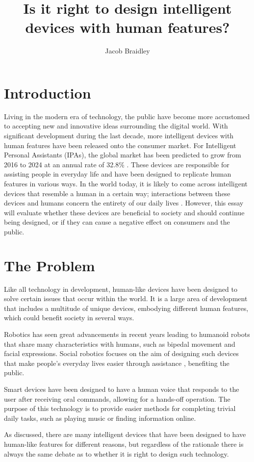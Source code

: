 \documentclass{article}
\title{Is it right to design intelligent devices with human features?}
\author{Jacob Braidley}
\date{}
\begin{document}
\maketitle

\vspace{0.5cm}

\section{Introduction}
Living in the modern era of technology, the public have become more accustomed to accepting new and innovative ideas surrounding the digital world. With significant development during the last decade, more intelligent devices with human features have been released onto the consumer market. For Intelligent Personal Assistants (IPAs), the global market has been predicted to grow from 2016 to 2024 at an annual rate of 32.8\% \cite{tmr2016market}. These devices are responsible for assisting people in everyday life and have been designed to replicate human features in various ways. In the world today, it is likely to come across intelligent devices that resemble a human in a certain way; interactions between these devices and humans concern the entirety of our daily lives \cite{securityTech2022interactions}. However, this essay will evaluate whether these devices are beneficial to society and should continue being designed, or if they can cause a negative effect on consumers and the public.

\section{The Problem}
Like all technology in development, human-like devices have been designed to solve certain issues that occur within the world. It is a large area of development that includes a multitude of unique devices, embodying different human features, which could benefit society in several ways.\par
Robotics has seen great advancements in recent years leading to humanoid robots that share many characteristics with humans, such as bipedal movement and facial expressions. Social robotics focuses on the aim of designing such devices that make people’s everyday lives easier through assistance \cite{wykowska2014social}, benefiting the public.\par
Smart devices have been designed to have a human voice that responds to the user after receiving oral commands, allowing for a hands-off operation. The purpose of this technology is to provide easier methods for completing trivial daily tasks, such as playing music or finding information online.\par
As discussed, there are many intelligent devices that have been designed to have human-like features for different reasons, but regardless of the rationale there is always the same debate as to whether it is right to design such technology.
\end{document}
